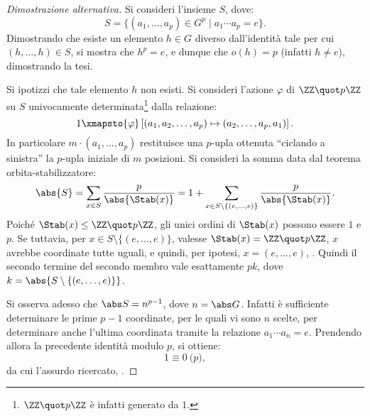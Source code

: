 \documentclass[12pt]{scrartcl}
\begin{document}
	\begin{proof}[Dimostrazione alternativa]
		Si consideri l'insieme $S$, dove:
		\[ S = \{ (a_1, \ldots, a_p) \in G^p \mid a_1 \cdots a_p = e \}. \]
		Dimostrando che esiste un elemento $h \in G$ diverso dall'identità tale
		per cui $(h, \ldots, h) \in S$, si mostra che $h^p = e$, e dunque che
		$o(h) = p$ (infatti $h \neq e$), dimostrando la tesi. \medskip
		
		
		Si ipotizzi che tale elemento $h$ non esisti. Si consideri l'azione $\varphi$
		di $\ZZ \quot p\ZZ$ su $S$ univocamente determinata\footnote{$\ZZ \quot p\ZZ$ è infatti generato da $1$.} dalla relazione:
		\[ 1 \xmapsto{\varphi} \left[ (a_1, a_2, \ldots, a_p) \mapsto (a_2, \ldots, a_p, a_1) \right]. \]
		In particolare $m \cdot (a_1, \ldots, a_p)$ restituisce una $p$-upla ottenuta
		``ciclando a sinistra'' la $p$-upla iniziale di $m$ posizioni. Si consideri la
		somma data dal teorema orbita-stabilizzatore:
		\[ \abs{S} = \sum_{x \in S} \frac{p}{\abs{\Stab(x)}} = 1 + \sum_{x \in S \setminus \{(e,\ldots,e)\}} \frac{p}{\abs{\Stab(x)}}. \]
		Poiché $\Stab(x) \leq \ZZ \quot p\ZZ$, gli unici ordini di $\Stab(x)$ possono
		essere $1$ e $p$. Se tuttavia, per $x \in S \setminus \{(e,\ldots,e)\}$,
		valesse $\Stab(x) = \ZZ \quot p\ZZ$, $x$ avrebbe coordinate tutte uguali,
		e quindi, per ipotesi, $x = (e,\ldots,e)$, \Lightning. Quindi il secondo
		termine del secondo membro vale esattamente $pk$, dove $k = \abs{S \setminus \{(e,\ldots,e)\}}$. \medskip
		
		
		Si osserva adesso che $\abs S = n^{p-1}$, dove $n = \abs G$. Infatti è sufficiente
		determinare le prime $p-1$ coordinate, per le quali vi sono $n$ scelte, per determinare
		anche l'ultima coordinata tramite la relazione $a_1 \cdots a_n = e$. Prendendo
		allora la precedente identità modulo $p$, si ottiene:
		\[ 1 \equiv 0 \pod p, \]
		da cui l'assurdo ricercato, \Lightning.
	\end{proof}
\end{document}
